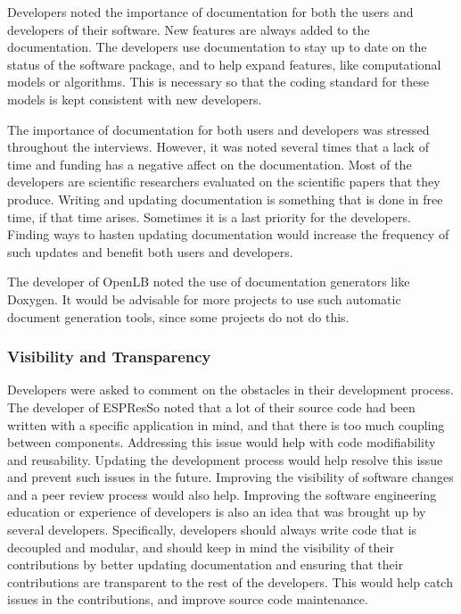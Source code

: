 \documentclass[12pt, notitlepage]{article}
\begin{document}
Developers noted the importance of documentation for both the users and developers of their software. New features are always added to the documentation. The developers use documentation to stay up to date on the status of the software package, and to help expand features, like computational models or algorithms. This is necessary so that the coding standard for these models is kept consistent with new developers.

The importance of documentation for both users and developers was stressed throughout the interviews. However, it was noted several times that a lack of time and funding has a negative affect on the documentation. Most of the developers are scientific researchers evaluated on the scientific papers that they produce. Writing and updating documentation is something that is done in free time, if that time arises. Sometimes it is a last priority for the developers. Finding ways to hasten updating documentation would increase the frequency of such updates and benefit both users and developers. 

The developer of OpenLB noted the use of documentation generators like Doxygen. It would be advisable for more projects to use such automatic document generation tools, since some projects do not do this.  

\subsubsection{Visibility and Transparency}

Developers were asked to comment on the obstacles in their development process. The developer of ESPResSo noted that a lot of their source code had been written with a specific application in mind, and that there is too much coupling between components. Addressing this issue would help with code modifiability and reusability. Updating the development process would help resolve this issue and prevent such issues in the future. Improving the visibility of software changes and a peer review process would also help. Improving the software engineering education or experience of developers is also an idea that was brought up by several developers. Specifically, developers should always write code that is decoupled and modular, and should keep in mind the visibility of their contributions by better updating documentation and ensuring that their contributions are transparent to the rest of the developers. This would help catch issues in the contributions, and improve source code maintenance.   
\end{document}
